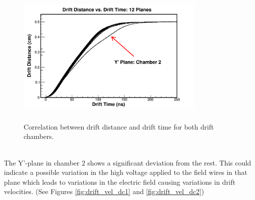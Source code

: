 \documentclass[journal, a4paper]{IEEEtran}
\begin{document}
\begin{figure}[!ht]
  \centering
  \includegraphics[width=3.6in, height=2.7in]{drift_velocity.png}
  \caption{Correlation between drift distance and drift time for both drift chambers.}
  \label{fig:drift_velocity}
\end{figure}\\
The Y'-plane in chamber 2 shows a significant deviation from the rest. This could indicate a possible variation in the
high voltage applied to the field wires in that plane which leads to variations in the electric field causing variations
in drift velocities. (See Figures \ref{fig:drift_vel_dc1} and \ref{fig:drift_vel_dc2})
\end{document}
